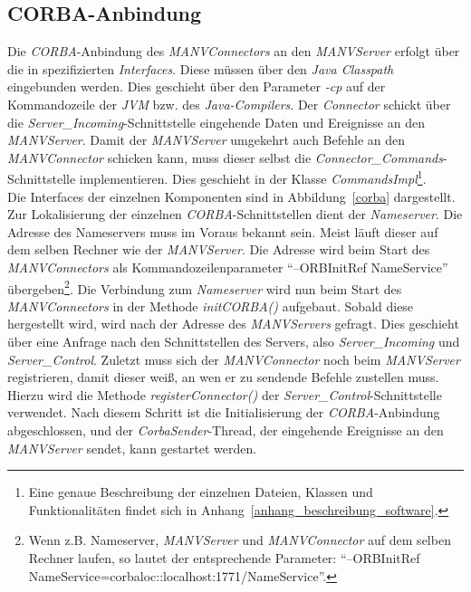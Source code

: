 \subsection{CORBA-Anbindung}
Die \emph{CORBA}-Anbindung des \emph{MANVConnectors} an den \emph{MANVServer} erfolgt über
die in \cite{Jan} spezifizierten \emph{Interfaces}. Diese müssen über den \emph{Java Classpath}
eingebunden werden. Dies geschieht über den Parameter \emph{-cp} auf der Kommandozeile
der \emph{JVM} bzw. des \emph{Java-Compilers}. Der \emph{Connector} schickt über die 
\emph{Server\_Incoming}-Schnittstelle eingehende Daten und Ereignisse an den \emph{MANVServer}.
Damit der \emph{MANV\-Server} umgekehrt auch Befehle an den \emph{MANVConnector} schicken kann,
muss dieser selbst die \emph{Connector\_Commands}-Schnittstelle implementieren. Dies
geschieht in der Klasse \emph{CommandsImpl}\footnote{Eine
genaue Beschreibung der einzelnen Dateien, Klassen und Funktionalitäten findet sich in
Anhang~\ref{anhang_beschreibung_software}.}.\\
Die Interfaces der einzelnen Komponenten sind in Abbildung~\ref{corba} dargestellt.\\

Zur Lokalisierung der einzelnen \emph{CORBA}-Schnittstellen dient der \emph{Nameserver}.
Die Adresse des Nameservers muss im Voraus bekannt sein. Meist läuft dieser auf dem selben Rechner
wie der \emph{MANVServer}. Die Adresse wird beim Start des \emph{MANVConnectors} als 
Kommandozeilenparameter "`--ORBInitRef NameService"' übergeben\footnote{Wenn z.B. Nameserver, \emph{MANVServer}
und \emph{MANVConnector} auf dem selben Rechner laufen, so lautet der entsprechende Parameter:
"`--ORBInitRef NameService=corbaloc::localhost:1771/NameService"'.}. Die Verbindung zum \emph{Nameserver}
wird nun beim Start des \emph{MANVConnectors} in der Methode \emph{initCORBA()} aufgebaut. 
Sobald diese hergestellt wird, wird nach der Adresse des \emph{MANVServers} gefragt. Dies geschieht über
eine Anfrage nach den Schnittstellen des Servers, also \emph{Server\_Incoming} und \emph{Server\_Control}. 
Zuletzt muss sich der \emph{MANVConnector} noch beim \emph{MANVServer} registrieren, damit dieser
weiß, an wen er zu sendende Befehle zustellen muss. Hierzu wird die Methode \emph{registerConnector()}
der \emph{Server\_Control}-Schnittstelle verwendet. Nach diesem Schritt ist die Initialisierung der
\emph{CORBA}-Anbindung abgeschlossen, und der \emph{CorbaSender}-Thread, der eingehende Ereignisse
an den \emph{MANVServer} sendet, kann gestartet werden.
